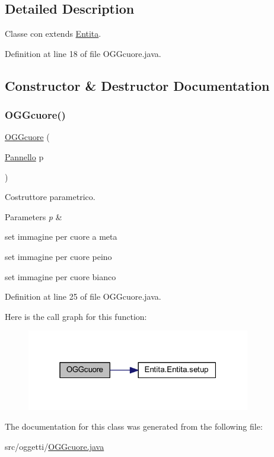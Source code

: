 \subsection{Detailed Description}
Classe con extends \hyperlink{namespace_entita}{Entita}. 

Definition at line 18 of file O\+G\+Gcuore.\+java.



\subsection{Constructor \& Destructor Documentation}
\mbox{\label{classoggetti_1_1_o_g_gcuore_a0107b552779c819ca78b66c4689e8b75}} 
\subsubsection{\texorpdfstring{O\+G\+Gcuore()}{OGGcuore()}}
{\footnotesize\ttfamily \hyperlink{classoggetti_1_1_o_g_gcuore}{O\+G\+Gcuore} (\begin{DoxyParamCaption}\item[{\hyperlink{classa_1_1survival_1_1game_1_1_pannello}{Pannello}}]{p }\end{DoxyParamCaption})}



Costruttore parametrico. 


\begin{DoxyParams}{Parameters}
{\em p} & \\
\hline
\end{DoxyParams}
set immagine per cuore a meta

set immagine per cuore peino

set immagine per cuore bianco

Definition at line 25 of file O\+G\+Gcuore.\+java.

Here is the call graph for this function\+:
\nopagebreak
\begin{figure}[H]
\begin{center}
\leavevmode
\includegraphics[width=277pt]{classoggetti_1_1_o_g_gcuore_a0107b552779c819ca78b66c4689e8b75_cgraph}
\end{center}
\end{figure}


The documentation for this class was generated from the following file\+:\begin{DoxyCompactItemize}
\item 
src/oggetti/\hyperlink{_o_g_gcuore_8java}{O\+G\+Gcuore.\+java}\end{DoxyCompactItemize}
